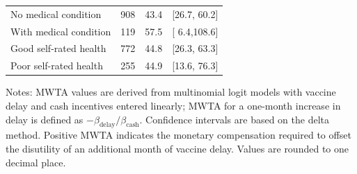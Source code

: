 \begin{table}[htbp]
\begin{threeparttable}
\begin{tabular}{lccc}
\quad No medical condition  &   908  & 43.4 & [26.7, 60.2] \\
\quad With medical condition&   119  & 57.5 & [  6.4,108.6] \\
\quad Good self-rated health&   772  & 44.8 & [26.3, 63.3] \\
\quad Poor self-rated health&   255  & 44.9 & [13.6, 76.3] \\
\bottomrule
\end{tabular}
\begin{tablenotes}[flushleft]
\footnotesize
\item Notes: MWTA values are derived from multinomial logit models with vaccine delay and 
cash incentives entered linearly; MWTA for a one-month increase in delay is defined as 
$-\beta_{\text{delay}}/\beta_{\text{cash}}$. Confidence intervals are based on the delta method. 
Positive MWTA indicates the monetary compensation required to offset the disutility of an 
additional month of vaccine delay. Values are rounded to one decimal place.
\end{tablenotes}
\end{threeparttable}
\end{table}
